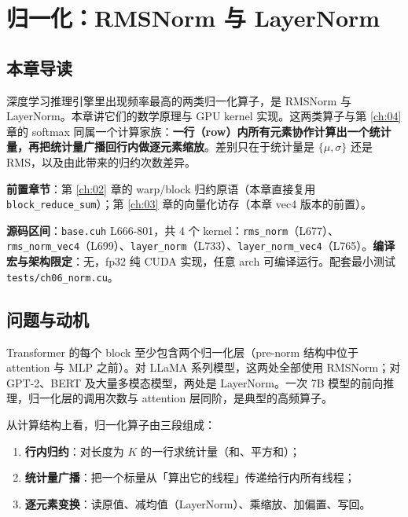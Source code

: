 \chapter{归一化：RMSNorm 与 LayerNorm}\label{ch:06}

\section{本章导读}

深度学习推理引擎里出现频率最高的两类归一化算子，是 RMSNorm 与 LayerNorm。本章讲它们的数学原理与 GPU kernel 实现。这两类算子与第 \ref{ch:04} 章的 softmax 同属一个计算家族：\textbf{一行（row）内所有元素协作计算出一个统计量，再把统计量广播回行内做逐元素缩放}。差别只在于统计量是 $\{\mu,\sigma\}$ 还是 RMS，以及由此带来的归约次数差异。

\textbf{前置章节}：第 \ref{ch:02} 章的 warp/block 归约原语（本章直接复用 \texttt{block\_\allowbreak{}reduce\_\allowbreak{}sum}）；第 \ref{ch:03} 章的向量化访存（本章 vec4 版本的前置）。

\textbf{源码区间}：\texttt{base.cuh} L666-801，共 4 个 kernel：\texttt{rms\_norm}（L677）、\texttt{rms\_\allowbreak{}norm\_\allowbreak{}vec4}（L699）、\texttt{layer\_norm}（L733）、\texttt{layer\_\allowbreak{}norm\_\allowbreak{}vec4}（L765）。\textbf{编译宏与架构限定}：无，fp32 纯 CUDA 实现，任意 arch 可编译运行。配套最小测试 \texttt{tests/\allowbreak{}ch06\_\allowbreak{}norm.\allowbreak{}cu}。

\section{问题与动机}

Transformer 的每个 block 至少包含两个归一化层（pre-norm 结构中位于 attention 与 MLP 之前）。对 LLaMA 系列模型，这两处全部使用 RMSNorm；对 GPT-2、BERT 及大量多模态模型，两处是 LayerNorm。一次 7B 模型的前向推理，归一化层的调用次数与 attention 层同阶，是典型的高频算子。

从计算结构上看，归一化算子由三段组成：
\begin{enumerate}
  \item \textbf{行内归约}：对长度为 $K$ 的一行求统计量（和、平方和）；
  \item \textbf{统计量广播}：把一个标量从「算出它的线程」传递给行内所有线程；
  \item \textbf{逐元素变换}：读原值、减均值（LayerNorm）、乘缩放、加偏置、写回。
\end{enumerate}

